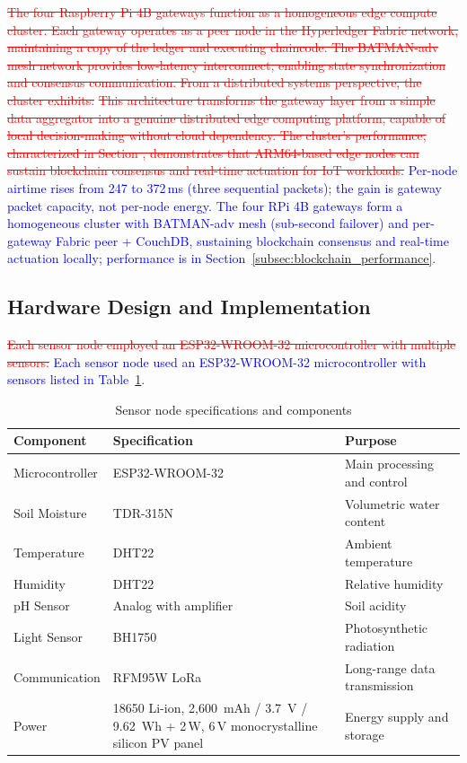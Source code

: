 \documentclass[pdflatex,sn-mathphys-num]{sn-jnl}
\theoremstyle{thmstyleone}
\theoremstyle{thmstyletwo}
\theoremstyle{thmstylethree}
\begin{document}
{\textcolor{red}{\sout{The four Raspberry Pi 4B gateways function as a homogeneous edge compute cluster. Each gateway operates as a peer node in the Hyperledger Fabric network, maintaining a copy of the ledger and executing chaincode. The BATMAN-adv mesh network provides low-latency interconnect, enabling state synchronization and consensus communication. From a distributed systems perspective, the cluster exhibits:}}
\textcolor{red}{\sout{This architecture transforms the gateway layer from a simple data aggregator into a genuine distributed edge computing platform, capable of local decision-making without cloud dependency. The cluster's performance, characterized in Section , demonstrates that ARM64-based edge nodes can sustain blockchain consensus and real-time actuation for IoT workloads.}}
\textcolor{blue}{Per-node airtime rises from 247 to 372\,ms (three sequential packets); the gain is gateway packet capacity, not per-node energy. The four RPi 4B gateways form a homogeneous cluster with BATMAN-adv mesh (sub-second failover) and per-gateway Fabric peer + CouchDB, sustaining blockchain consensus and real-time actuation locally; performance is in Section~\ref{subsec:blockchain_performance}.}

\subsection{Hardware Design and Implementation}
\label{subsec:hardware}

\textcolor{red}{\sout{Each sensor node employed an ESP32-WROOM-32 microcontroller with multiple sensors:}}
\textcolor{blue}{Each sensor node used an ESP32-WROOM-32 microcontroller \cite{espressif2020esp32} with sensors listed in Table~\ref{tab:sensor-specs}.}

\begin{table}[!t]
\centering
\caption{Sensor node specifications and components}
\label{tab:sensor-specs}
\begin{tabularx}{\linewidth}{l X X}
\toprule
\textbf{Component} & \textbf{Specification} & \textbf{Purpose} \\
\midrule
Microcontroller & ESP32-WROOM-32 & Main processing and control \\
Soil Moisture & TDR-315N & Volumetric water content \\
Temperature & DHT22 & Ambient temperature \\
Humidity & DHT22 & Relative humidity \\
pH Sensor & Analog with amplifier & Soil acidity \\
Light Sensor & BH1750 & Photosynthetic radiation \\
Communication & RFM95W LoRa & Long-range data transmission \cite{adafruit2016rfm95w} \\
Power & 18650 Li-ion, 2,600~mAh / 3.7~V / 9.62~Wh + 2\,W, 6\,V monocrystalline silicon PV panel & Energy supply and storage \\
\bottomrule
\end{tabularx}
\end{table}

}
\end{document}
